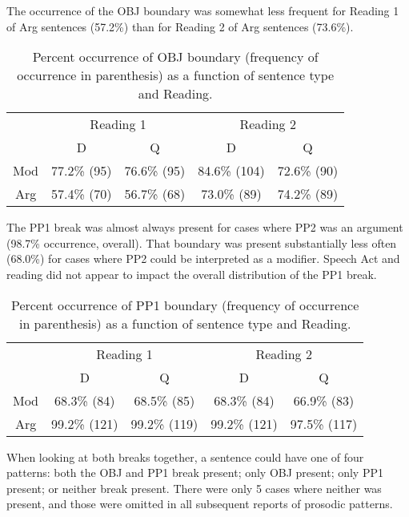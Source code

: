 \documentclass[11pt,oneside]{book}
\begin{document}
The occurrence of the OBJ boundary was somewhat less frequent for Reading 1 of Arg sentences (57.2\%) than for Reading 2 of Arg sentences (73.6\%).

\begin{table}[!h]

\caption{\label{tab:obj}Percent occurrence of OBJ boundary (frequency of occurrence in parenthesis) as a function of sentence type and Reading.}
\centering
\begin{tabular}{ccccc}
\toprule
\multicolumn{1}{c}{ } & \multicolumn{2}{c}{Reading 1} & \multicolumn{2}{c}{Reading 2} \\
\cmidrule(l{3pt}r{3pt}){2-3} \cmidrule(l{3pt}r{3pt}){4-5}
 & D & Q & D & Q\\
\midrule
Mod & 77.2\% (95) & 76.6\% (95) & 84.6\% (104) & 72.6\% (90)\\
Arg & 57.4\% (70) & 56.7\% (68) & 73.0\% (89) & 74.2\% (89)\\
\bottomrule
\end{tabular}
\end{table}

The PP1 break was almost always present for cases where PP2 was an argument (98.7\% occurrence, overall). That boundary was present substantially less often (68.0\%) for cases where PP2 could be interpreted as a modifier. Speech Act and reading did not appear to impact the overall distribution of the PP1 break.

\begin{table}[!h]

\caption{\label{tab:pp1}Percent occurrence of PP1 boundary (frequency of occurrence in parenthesis) as a function of sentence type and Reading.}
\centering
\begin{tabular}{ccccc}
\toprule
\multicolumn{1}{c}{ } & \multicolumn{2}{c}{Reading 1} & \multicolumn{2}{c}{Reading 2} \\
\cmidrule(l{3pt}r{3pt}){2-3} \cmidrule(l{3pt}r{3pt}){4-5}
 & D & Q & D & Q\\
\midrule
Mod & 68.3\% (84) & 68.5\% (85) & 68.3\% (84) & 66.9\% (83)\\
Arg & 99.2\% (121) & 99.2\% (119) & 99.2\% (121) & 97.5\% (117)\\
\bottomrule
\end{tabular}
\end{table}

When looking at both breaks together, a sentence could have one of four patterns: both the OBJ and PP1 break present; only OBJ present; only PP1 present; or neither break present. There were only 5 cases where neither was present, and those were omitted in all subsequent reports of prosodic patterns.
\end{document}
